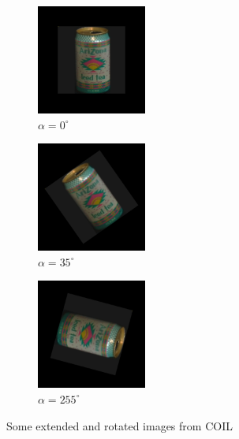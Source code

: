 \begin{figure}[tbp]
	\begin{subfigure}{0.30\textwidth}
        \centering
    \includegraphics[width=102pt]{figures/coil_rot/7r0.png}
    \caption{$\alpha=0^{\circ}$}
	\end{subfigure}
	\begin{subfigure}{0.30\textwidth}
        \centering
    \includegraphics[width=102pt]{figures/coil_rot/7r35.png}
    \caption{$\alpha=35^{\circ}$}
	\end{subfigure}
	\begin{subfigure}{0.30\textwidth}
        \centering
    \includegraphics[width=102pt]{figures/coil_rot/7r255.png}
    \caption{$\alpha=255^{\circ}$}
	\end{subfigure}
	\caption{Some extended and rotated images from COIL}
	\label{fig:coil_rot}
\end{figure}

